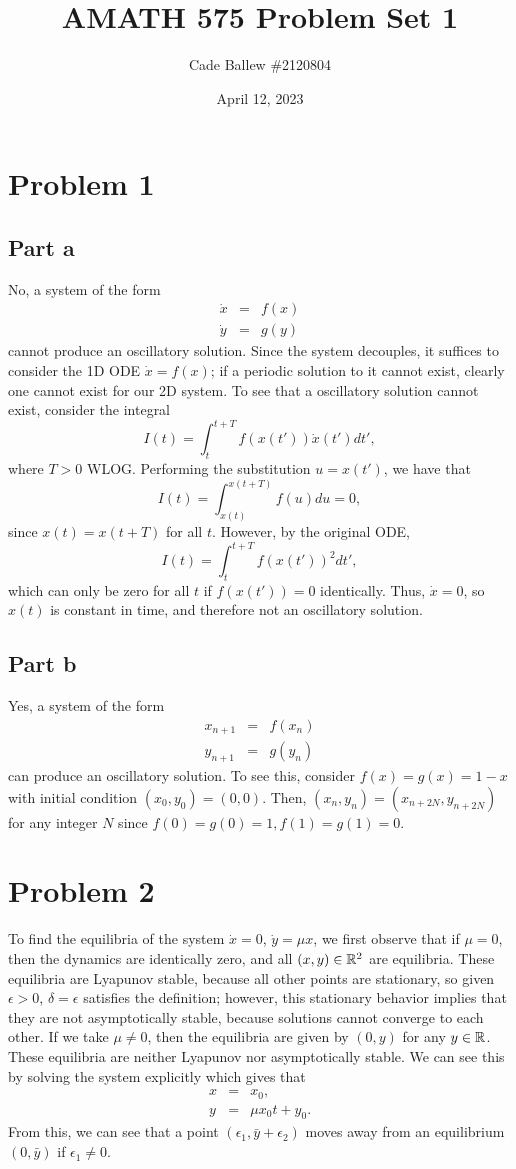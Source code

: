 \documentclass{article}
\title{AMATH 575 Problem Set 1}
\author{Cade Ballew \#2120804}
\date{April 12, 2023}
\begin{document}
	
\maketitle
	
\section{Problem 1}
\subsection{Part a}
No, a system of the form 
\begin{eqnarray*} 
	\dot x &=& f(x) \\
	\dot y &=& g(y) 
\end{eqnarray*}
cannot produce an oscillatory solution. Since the system decouples, it suffices to consider the 1D ODE $\dot x = f(x)$; if a periodic solution to it cannot exist, clearly one cannot exist for our 2D system. To see that a oscillatory solution cannot exist, consider the integral 
\[
I(t)=\int_{t}^{t+T}f(x(t'))\dot x(t')dt',
\]
where $T>0$ WLOG. Performing the substitution $u=x(t')$, we have that 
\[
I(t)=\int_{x(t)}^{x(t+T)}f(u)du=0,
\]
since $x(t)=x(t+T)$ for all $t$. However, by the original ODE,
\[
I(t)=\int_{t}^{t+T}f(x(t'))^2dt',
\]
which can only be zero for all $t$ if $f(x(t'))=0$ identically. Thus, $\dot x=0$, so $x(t)$ is constant in time, and therefore not an oscillatory solution.
\subsection{Part b}
Yes, a system of the form 
\begin{eqnarray*} 	x_{n+1} &=& f(x_n) \\
	y_{n+1} &=& g(y_n) 
\end{eqnarray*}
can produce an oscillatory solution. To see this, consider $f(x)=g(x)=1-x$ with initial condition $(x_0,y_0)=(0,0)$. Then, $(x_n,y_n)=(x_{n+2N},y_{n+2N})$ for any integer $N$ since $f(0)=g(0)=1,f(1)=g(1)=0$.

\section{Problem 2}
To find the equilibria of the system $\dot x = 0$, $\dot y = \mu x$, we first observe that if $\mu=0$, then the dynamics are identically zero, and all $(x,y)\in\mathbb{R}^2$ are equilibria. These equilibria are Lyapunov stable, because all other points are stationary, so given $\epsilon>0$, $\delta=\epsilon$ satisfies the definition; however, this stationary behavior implies that they are not asymptotically stable, because solutions cannot converge to each other. If we take $\mu\neq0$, then the equilibria are given by $(0,y)$ for any $y\in\mathbb{R}$. These equilibria are neither Lyapunov nor asymptotically stable. We can see this by solving the system explicitly which gives that
\begin{eqnarray*} 
	x &=& x_0, \\
	y &=& \mu x_0t+y_0. 
\end{eqnarray*}
From this, we can see that a point $(\epsilon_1,\bar y+\epsilon_2)$ moves away from an equilibrium $(0,\bar y)$ if $\epsilon_1\neq0$.
\end{document}
